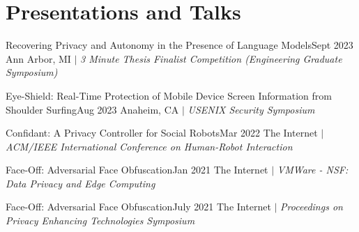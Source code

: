 \section{Presentations and Talks}
  \CVSubHeadingListStart

    \CVSubheading
      {{Recovering Privacy and Autonomy in the Presence of Language Models}}{Sept 2023}
      {{Ann Arbor, MI} $|$ \emph{\small{3 Minute Thesis Finalist Competition (Engineering Graduate Symposium)}}}{}

    \CVSubheading
      {{Eye-Shield: Real-Time Protection of Mobile Device Screen Information from Shoulder Surfing}\cite{ShoulderSurfing}}{Aug 2023}
      {{Anaheim, CA} $|$ \emph{\small{USENIX Security Symposium}}}{}

    \CVSubheading
      {{Confidant: A Privacy Controller for Social Robots}\cite{HRIPrivacy}}{Mar 2022}
      {{The Internet} $|$ \emph{\small{ACM/IEEE International Conference on Human-Robot Interaction}}}{}

    \CVSubheading
      {{Face-Off: Adversarial Face Obfuscation}\cite{FaceOff}}{Jan 2021}
      {{The Internet} $|$ \emph{\small{VMWare - NSF: Data Privacy and Edge Computing}}}{}
      
    \CVSubheading
      {{Face-Off: Adversarial Face Obfuscation}\cite{FaceOff}}{July 2021}
      {{The Internet} $|$ \emph{\small{Proceedings on Privacy Enhancing Technologies Symposium}}}{}
  \CVSubHeadingListEnd
